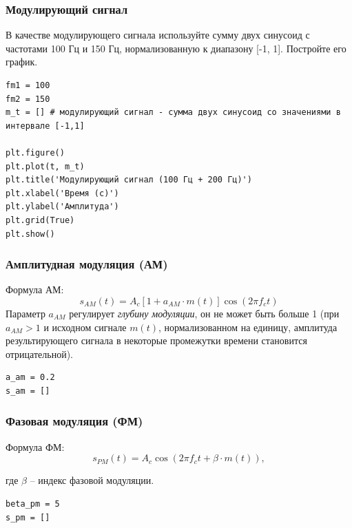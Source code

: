 \documentclass[12pt,a4paper,openany]{book}
\begin{document}
\subsubsection*{Модулирующий сигнал}

В качестве модулирующего сигнала используйте сумму двух синусоид с частотами 100 Гц и 150 Гц, нормализованную к диапазону {[}-1, 1{]}. Постройте его график.

\begin{Verbatim}[fontsize=\small, breaklines, breakanywhere, frame=single, framesep=2mm]
fm1 = 100
fm2 = 150
m_t = [] # модулирующий сигнал - сумма двух синусоид со значениями в интервале [-1,1]

plt.figure()
plt.plot(t, m_t)
plt.title('Модулирующий сигнал (100 Гц + 200 Гц)')
plt.xlabel('Время (с)')
plt.ylabel('Амплитуда')
plt.grid(True)
plt.show()
\end{Verbatim}

\subsubsection*{Амплитудная модуляция (АМ)}

Формула АМ:
\[s_{AM}(t) = A_c [1 + a_{AM}\cdot m(t)] \cos(2\pi f_c t)
\]
Параметр \(a_{AM}\) регулирует \emph{глубину модуляции}, он не может быть больше 1 (при \(a_{AM}>1\) и исходном сигнале \(m(t)\), нормализованном на единицу, амплитуда результирующего сигнала в некоторые промежутки времени становится отрицательной).

\begin{Verbatim}[fontsize=\small, breaklines, breakanywhere, frame=single, framesep=2mm]
a_am = 0.2
s_am = []
\end{Verbatim}

\subsubsection*{Фазовая модуляция (ФМ)}

Формула ФМ:
\[
s_{PM}(t) = A_c \cos(2\pi f_c t + \beta \cdot m(t)),
\]

где \(\beta\) -- индекс фазовой модуляции.

\begin{Verbatim}[fontsize=\small, breaklines, breakanywhere, frame=single, framesep=2mm]
beta_pm = 5
s_pm = []
\end{Verbatim}
\end{document}
